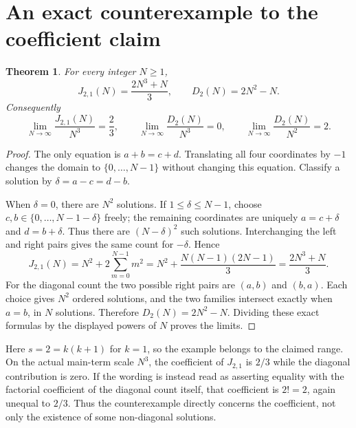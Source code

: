 \documentclass[11pt]{article}
\newtheorem{theorem}{Theorem}
\begin{document}
\section*{An exact counterexample to the coefficient claim}
\begin{theorem}
For every integer $N\geq1$,
\[
 J_{2,1}(N)=\frac{2N^3+N}{3},\qquad D_2(N)=2N^2-N.
\]
Consequently
\[
 \lim_{N\to\infty}\frac{J_{2,1}(N)}{N^3}=\frac23,
 \qquad \lim_{N\to\infty}\frac{D_2(N)}{N^3}=0,
 \qquad \lim_{N\to\infty}\frac{D_2(N)}{N^2}=2.
\]
\end{theorem}
\begin{proof}
The only equation is $a+b=c+d$. Translating all four coordinates by $-1$ changes the domain to $\{0,\ldots,N-1\}$ without changing this equation. Classify a solution by $\delta=a-c=d-b$.

When $\delta=0$, there are $N^2$ solutions. If $1\leq\delta\leq N-1$, choose $c,b\in\{0,\ldots,N-1-\delta\}$ freely; the remaining coordinates are uniquely $a=c+\delta$ and $d=b+\delta$. Thus there are $(N-\delta)^2$ such solutions. Interchanging the left and right pairs gives the same count for $-\delta$. Hence
\[
 J_{2,1}(N)=N^2+2\sum_{m=0}^{N-1}m^2
 =N^2+\frac{N(N-1)(2N-1)}3
 =\frac{2N^3+N}{3}.
\]
For the diagonal count the two possible right pairs are $(a,b)$ and $(b,a)$. Each choice gives $N^2$ ordered solutions, and the two families intersect exactly when $a=b$, in $N$ solutions. Therefore $D_2(N)=2N^2-N$. Dividing these exact formulas by the displayed powers of $N$ proves the limits.
\end{proof}

Here $s=2=k(k+1)$ for $k=1$, so the example belongs to the claimed range. On the actual main-term scale $N^3$, the coefficient of $J_{2,1}$ is $2/3$ while the diagonal contribution is zero. If the wording is instead read as asserting equality with the factorial coefficient of the diagonal count itself, that coefficient is $2!=2$, again unequal to $2/3$. Thus the counterexample directly concerns the coefficient, not only the existence of some non-diagonal solutions.
\end{document}
